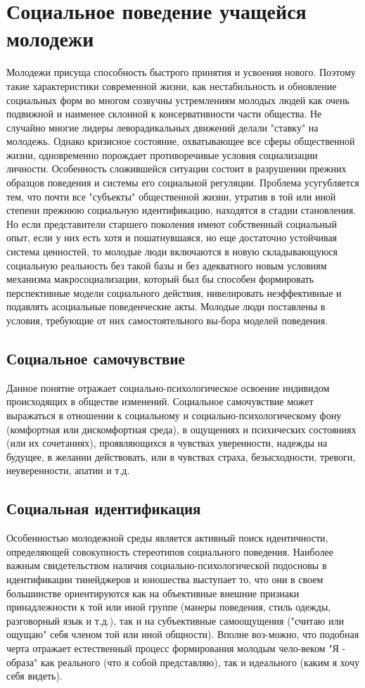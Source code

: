 \chapter{Социальное поведение учащейся молодежи}
Молодежи присуща способность быстрого принятия и усвоения нового. Поэтому 
такие характеристики современной жизни, как нестабильность и обновление 
социальных форм во многом созвучны устремлениям молодых людей как очень 
подвижной и наименее склонной к консервативности части общества. Не случайно 
многие лидеры леворадикальных движений делали "ставку" на молодежь. Однако 
кризисное состояние, охватывающее все сферы общественной жизни, одновременно 
порождает противоречивые условия социализации личности. Особенность 
сложившейся ситуации состоит в разрушении прежних образцов поведения и 
системы его социальной регуляции. Проблема усугубляется тем, что почти все 
"субъекты" общественной жизни, утратив в той или иной степени прежнюю 
социальную идентификацию, находятся в стадии становления. Но если 
представители старшего поколения имеют собственный социальный опыт, если у 
них есть хотя и пошатнувшаяся, но еще достаточно устойчивая система ценностей, 
то молодые люди включаются в новую складывающуюся социальную реальность без 
такой базы и без адекватного новым условиям механизма макросоциализации, 
который был бы способен формировать перспективные модели социального действия, 
нивелировать неэффективные и подавлять асоциальные поведенческие акты. Молодые 
люди поставлены в условия, требующие от них самостоятельного вы-бора моделей 
поведения. \cite{golub}

\section{Социальное самочувствие}

Данное понятие отражает социально-психологическое освоение индивидом 
происходящих в обществе изменений. Социальное самочувствие может выражаться в 
отношении к социальному и социально-психологическому фону (комфортная или 
дискомфортная среда), в ощущениях и психических состояниях (или их 
сочетаниях), проявляющихся в чувствах уверенности, надежды на будущее, в 
желании действовать, или в чувствах страха, безысходности, тревоги, 
неуверенности, апатии и т.д. \cite{golub}

\section{Социальная идентификация}
Особенностью молодежной среды является активный поиск идентичности, 
определяющей совокупность стереотипов социального поведения.
Наиболее важным свидетельством наличия социально-психологической подосновы в 
идентификации тинейджеров и юношества выступает то, что они в своем 
большинстве ориентируются как на объективные внешние признаки принадлежности 
к той или иной группе (манеры поведения, стиль одежды, разговорный язык и 
т.д.), так и на субъективные самоощущения ("считаю или ощущаю" себя членом 
той или иной общности). Вполне воз-можно, что подобная черта отражает 
естественный процесс формирования молодым чело-веком "Я - образа" как 
реального (что я собой представляю), так и идеального (каким я хочу себя 
видеть). \cite{golub}

